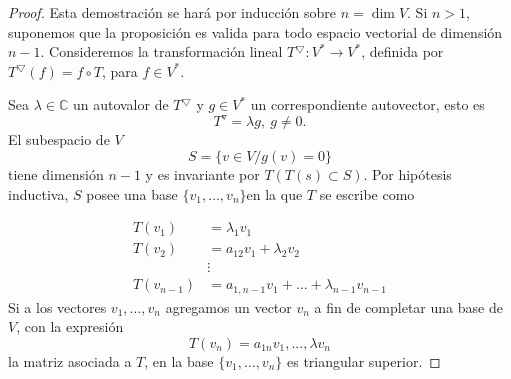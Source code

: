 \documentclass[b5paper, 11pt]{book}
\newcommand{\0}{\mathbf{0}}
\theoremstyle{estiloB}
\theoremstyle{estiloC}
\theoremstyle{estiloD}
\begin{document}
\begin{proof}
	Esta demostración se hará por inducción sobre $n=\dim V$. Si $n>1$, suponemos que la proposición es valida para todo espacio vectorial de dimensión $n-1$. Consideremos la transformación lineal $T^{\bigtriangledown}\colon V^{*} \rightarrow V^{*}$, definida por $T^{\bigtriangledown}(f)=f\circ T$, para $f\in V^{*}$.
	
	Sea $\lambda\in\mathbb{C}$ un autovalor de $T^{\bigtriangledown}$ y $g\in V^{*}$ un correspondiente autovector, esto es \[T^{\triangledown} = \lambda g ,~ g\neq 0.\] El subespacio de $V$ \[S = \{v \in V / g(v) = 0\}\] tiene dimensión $n-1$ y es invariante por $T(T(s)\subset S)$. Por hipótesis inductiva, $S$ posee una base $\{v_{1},\ldots,v_{n}\}$en la que $T$ se escribe como
	
	\begin{align*}
	T(v_{1}) & = \lambda_{1}v_{1}\\
	T(v_{2}) & = a_{12}v_{1} + \lambda_{2}v_{2}\\
	& \vdots\\
	T(v_{n-1}) & = a_{1,n-1}v_{1} +...+ \lambda_{n-1}v_{n-1}
	\end{align*}
	Si a los vectores $v_{1},\ldots,v_{n}$ agregamos un vector $v_{n}$ a fin de completar una base de $V$, con la expresión \[T(v_{n}) = a_{1n}v_{1},...,\lambda v_{n} \]
	la matriz asociada a $T$, en la base $\{v_{1},\ldots,v_{n}\}$ es triangular superior.
\end{proof}

\nocite{*}
\printbibliography[title={Referencias bibliográficas},heading=bibintoc]
\end{document}

